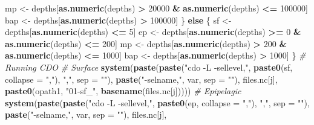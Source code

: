 \documentclass[]{book}
\newenvironment{Shaded}{\begin{snugshade}}{\end{snugshade}}
\newcommand{\CommentTok}[1]{\textcolor[rgb]{0.56,0.35,0.01}{\textit{#1}}}
\newcommand{\ControlFlowTok}[1]{\textcolor[rgb]{0.13,0.29,0.53}{\textbf{#1}}}
\newcommand{\DataTypeTok}[1]{\textcolor[rgb]{0.13,0.29,0.53}{#1}}
\newcommand{\DecValTok}[1]{\textcolor[rgb]{0.00,0.00,0.81}{#1}}
\newcommand{\KeywordTok}[1]{\textcolor[rgb]{0.13,0.29,0.53}{\textbf{#1}}}
\newcommand{\NormalTok}[1]{#1}
\newcommand{\OperatorTok}[1]{\textcolor[rgb]{0.81,0.36,0.00}{\textbf{#1}}}
\newcommand{\StringTok}[1]{\textcolor[rgb]{0.31,0.60,0.02}{#1}}
\begin{document}
\begin{Shaded}
\begin{Highlighting}[]
{{\NormalTok{          mp <-}\StringTok{ }\NormalTok{depths[}\KeywordTok{as.numeric}\NormalTok{(depths) }\OperatorTok{>}\StringTok{ }\DecValTok{20000} \OperatorTok{&}\StringTok{ }\KeywordTok{as.numeric}\NormalTok{(depths) }\OperatorTok{<=}\StringTok{ }\DecValTok{100000}\NormalTok{]}
\NormalTok{          bap <-}\StringTok{ }\NormalTok{depths[}\KeywordTok{as.numeric}\NormalTok{(depths) }\OperatorTok{>}\StringTok{ }\DecValTok{100000}\NormalTok{]}
\NormalTok{        \} }\ControlFlowTok{else}\NormalTok{ \{}
\NormalTok{          sf <-}\StringTok{ }\NormalTok{depths[}\KeywordTok{as.numeric}\NormalTok{(depths) }\OperatorTok{<=}\StringTok{ }\DecValTok{5}\NormalTok{]}
\NormalTok{          ep <-}\StringTok{ }\NormalTok{depths[}\KeywordTok{as.numeric}\NormalTok{(depths) }\OperatorTok{>=}\StringTok{ }\DecValTok{0} \OperatorTok{&}\StringTok{ }\KeywordTok{as.numeric}\NormalTok{(depths) }\OperatorTok{<=}\StringTok{ }\DecValTok{200}\NormalTok{]}
\NormalTok{          mp <-}\StringTok{ }\NormalTok{depths[}\KeywordTok{as.numeric}\NormalTok{(depths) }\OperatorTok{>}\StringTok{ }\DecValTok{200} \OperatorTok{&}\StringTok{ }\KeywordTok{as.numeric}\NormalTok{(depths) }\OperatorTok{<=}\StringTok{ }\DecValTok{1000}\NormalTok{]}
\NormalTok{          bap <-}\StringTok{ }\NormalTok{depths[}\KeywordTok{as.numeric}\NormalTok{(depths) }\OperatorTok{>}\StringTok{ }\DecValTok{1000}\NormalTok{]}
\NormalTok{        \}}
      \CommentTok{# Running CDO}
        \CommentTok{# Surface}
          \KeywordTok{system}\NormalTok{(}\KeywordTok{paste}\NormalTok{(}\KeywordTok{paste}\NormalTok{(}\StringTok{"cdo -L -sellevel,"}\NormalTok{, }
                             \KeywordTok{paste0}\NormalTok{(sf, }\DataTypeTok{collapse =} \StringTok{","}\NormalTok{), }\StringTok{","}\NormalTok{, }\DataTypeTok{sep =} \StringTok{""}\NormalTok{), }
                       \KeywordTok{paste}\NormalTok{(}\StringTok{"-selname,"}\NormalTok{, var, }\DataTypeTok{sep =} \StringTok{""}\NormalTok{), files.nc[j], }
                       \KeywordTok{paste0}\NormalTok{(opath1, }\StringTok{"01-sf_"}\NormalTok{, }\KeywordTok{basename}\NormalTok{(files.nc[j]))))}
        \CommentTok{# Epipelagic}
          \KeywordTok{system}\NormalTok{(}\KeywordTok{paste}\NormalTok{(}\KeywordTok{paste}\NormalTok{(}\StringTok{"cdo -L -sellevel,"}\NormalTok{, }
                             \KeywordTok{paste0}\NormalTok{(ep, }\DataTypeTok{collapse =} \StringTok{","}\NormalTok{), }\StringTok{","}\NormalTok{, }\DataTypeTok{sep =} \StringTok{""}\NormalTok{), }
                       \KeywordTok{paste}\NormalTok{(}\StringTok{"-selname,"}\NormalTok{, var, }\DataTypeTok{sep =} \StringTok{""}\NormalTok{), files.nc[j], }
}}
\end{Highlighting}
\end{Shaded}
\end{document}

